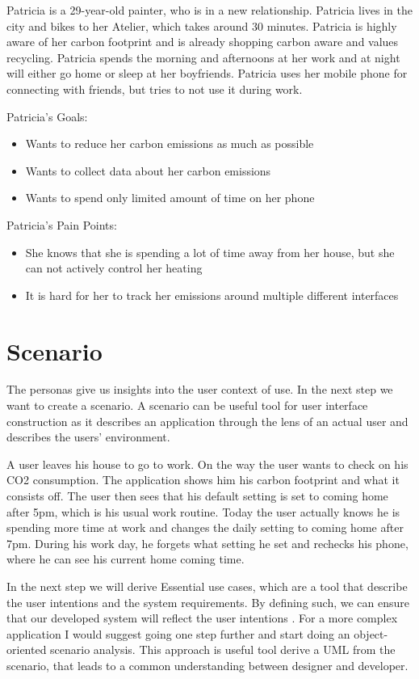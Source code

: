 \documentclass[]{interact}
\theoremstyle{plain}%
\theoremstyle{definition}
\theoremstyle{remark}
\begin{document}
Patricia is a 29-year-old painter, who is in a new relationship. Patricia lives in the city and bikes to her Atelier, which takes around 30 minutes.
Patricia is highly aware of her carbon footprint and is already shopping carbon aware and values recycling. Patricia spends the morning and afternoons at her work and at night will either go home or sleep at her boyfriends. Patricia uses her mobile phone for connecting with friends, but tries to not use it during work.

Patricia's Goals:
\begin{itemize}
  \item Wants to reduce her carbon emissions as much as possible
  \item Wants to collect data about her carbon emissions
  \item Wants to spend only limited amount of time on her phone
\end{itemize}

Patricia's Pain Points:
\begin{itemize}
  \item She knows that she is spending a lot of time away from her house, but she can not actively control her heating
  \item It is hard for her to track her emissions around multiple different interfaces
\end{itemize}

\section*{Scenario}

The personas give us insights into the user context of use. In the next step we want to create a scenario. A scenario can be useful tool for user interface construction as it describes an application through the lens of an actual user and describes the users' environment.

A user leaves his house to go to work. On the way the user wants to check on his CO2 consumption. The application shows him his carbon footprint and what it consists off. The user then sees that his default setting is set to coming home after 5pm, which is his usual work routine. Today the user actually knows he is spending more time at work and changes the daily setting to coming home after 7pm. During his work day, he forgets what setting he set and rechecks his phone, where he can see his current home coming time.

In the next step we will derive Essential use cases, which are a tool that describe the user intentions and the system requirements.
By defining such, we can ensure that our developed system will reflect the user intentions \citep*{constantine_structure_2000}.
For a more complex application I would suggest going one step further and start doing an object-oriented scenario analysis. This approach is useful tool derive a UML from the scenario, that leads to a common understanding between designer and developer.
\end{document}
